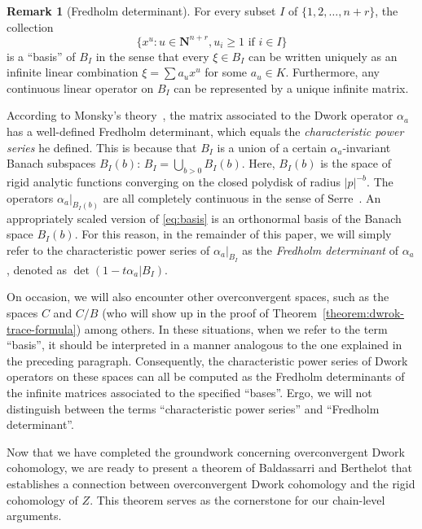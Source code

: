 \documentclass{amsart}
\numberwithin{equation}{section}
\theoremstyle{plain}
\theoremstyle{definition}
\newtheorem{remark}[equation]{Remark}
\renewcommand{\mathbb}{\mathbf}
\begin{document}
\begin{remark}[Fredholm determinant]%
For every subset \(I\) of \(\{1,2,\ldots,n+r\}\), the collection
\begin{equation}
\label{eq:basis}
\{x^u: u\in \mathbb{N}^{n+r}, u_i \geq 1 \text{ if } i \in I\}
\end{equation}
is a ``basis'' of \(B_I\) in the sense that every \(\xi \in B_I\) can
be written uniquely as an infinite linear combination
\(\xi = \sum a_u x^u\) for some \(a_u \in K\).  Furthermore, any
continuous linear operator on \(B_I\) can be represented by a unique
infinite matrix.

According to Monsky's theory~\cite[Theorem~1.6]{monsky:formal-cohomology-3},
the matrix associated to the Dwork operator \(\alpha_a\) has a
well-defined Fredholm determinant, which equals the
\emph{characteristic power series} he defined.  This is because that \(B_I\)
is a union of a certain \(\alpha_a\)-invariant Banach subspaces
\(B_I(b)\): \(B_I=\bigcup_{b>0} B_I(b)\).  Here, \(B_I(b)\) is the
space of rigid analytic functions converging on the closed polydisk of
radius \(|p|^{-b}\).  The operators \(\alpha_a|_{B_I(b)}\) are all
completely continuous in the sense of Serre~\cite{serre:completely-continuous-endomorphisms-on-p-adic-banach-spaces}.  An appropriately scaled version of
\eqref{eq:basis} is an orthonormal basis of the Banach space
\(B_I(b)\).  For this reason, in the remainder of this paper, we will
simply refer to the characteristic power series of \(\alpha_a|_{B_{I}}\) as
the \emph{Fredholm determinant} of \(\alpha_a\), denoted as
\(\det(1 - t\alpha_a| B_{I})\).

On occasion, we will also encounter other overconvergent spaces, such
as the spaces \(C\) and \(C/B\) (who will show up in the proof of
Theorem~\ref{theorem:dwrok-trace-formula}) among others.  In these
situations, when we refer to the term ``basis'', it should be
interpreted in a manner analogous to the one explained in the
preceding paragraph.  Consequently, the characteristic power series of Dwork
operators on these spaces can all be computed as the Fredholm
determinants of the infinite matrices associated to the specified
``bases''.  Ergo, we will not distinguish between the terms
``characteristic power series'' and ``Fredholm determinant''.
\end{remark}



Now that we have completed the groundwork concerning overconvergent
Dwork cohomology, we are ready to present a theorem of Baldassarri and
Berthelot that establishes a connection between overconvergent Dwork
cohomology and the rigid cohomology of \(Z\).  This theorem serves as
the cornerstone for our chain-level arguments.
\end{document}
